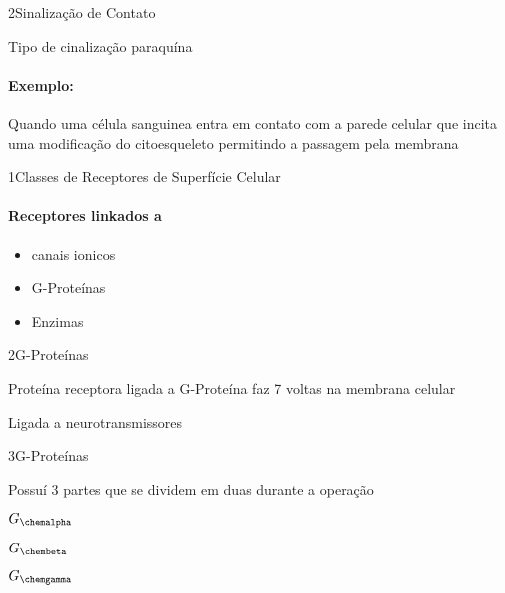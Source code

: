 \documentclass[\mainfilename]{subfiles}
\begin{document}
\begin{sectionBox}2{Sinalização de Contato} %
    
    Tipo de cinalização paraquína

    \paragraph*{Exemplo:} Quando uma célula sanguinea entra em contato com a parede celular que incita uma modificação do citoesqueleto permitindo a passagem pela membrana
    
\end{sectionBox}

\begin{sectionBox}1{Classes de Receptores de Superfície Celular} %
    
    \paragraph*{Receptores linkados a}
    \begin{itemize}
        \item canais ionicos
        \item G-Proteínas
        \item Enzimas
    \end{itemize}
    
\end{sectionBox}

\begin{sectionBox}2{G-Proteínas} %
    
    Proteína receptora ligada a G-Proteína faz 7 voltas na membrana celular 

    Ligada a neurotransmissores

    \begin{sectionBox}3{G-Proteínas} %
        
        Possuí 3 partes que se dividem em duas durante a operação

        \begin{itemize}
            \begin{multicols}{2}
                \item \(G_{\chemalpha}\)
                \item \(G_{\chembeta}\)
                \item \(G_{\chemgamma}\)
            \end{multicols}
        \end{itemize}
        
    \end{sectionBox}
    
\end{sectionBox}
\end{document}
